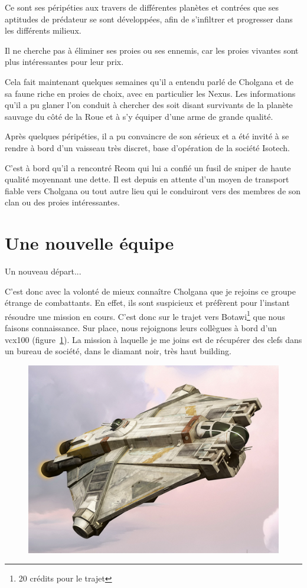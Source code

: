 \documentclass[a4paper,9pt,twoside,twocolumn,openany]{book}
\begin{document}
Ce sont ses péripéties aux travers de différentes planètes et contrées que ses aptitudes de prédateur se sont développées, afin de s'infiltrer et progresser dans les différents milieux.

Il ne cherche pas à éliminer ses proies ou ses ennemis, car les proies vivantes sont plus intéressantes pour leur prix.

Cela fait maintenant quelques semaines qu'il a entendu parlé de Cholgana et de sa faune riche en proies de choix, avec en particulier les Nexus. Les informations qu’il a pu glaner l’on conduit à chercher des soit disant survivants de la planète sauvage du côté de la Roue et à s’y équiper d’une arme de grande qualité.

Après quelques péripéties, il a pu convaincre de son sérieux et a été invité à se rendre à bord d’un vaisseau très discret, base d’opération de la société Isotech.

C’est à bord qu'il a rencontré Reom qui lui a confié un fusil de sniper de haute qualité moyennant une dette. Il est depuis en attente d’un moyen de transport fiable vers Cholgana ou tout autre lieu qui le conduiront vers des membres de son clan ou des proies intéressantes.

\section{Une nouvelle équipe}
\subtitle{8 décembre 2019}

Un nouveau départ...

C'est donc avec la volonté de mieux connaître Cholgana que je rejoins ce groupe étrange de combattants. En effet, ils sont suspicieux et préfèrent pour l'instant résoudre une mission en cours. C'est donc sur le trajet vers Botawi\footnote{20 crédits pour le trajet} que nous faisons connaissance. Sur place, nous rejoignons leurs collègues à bord d'un vcx100 (figure~\ref{vcx100}). La mission à laquelle je me joins est de récupérer des clefs dans un bureau de société, dans le diamant noir, très haut building.

\begin{figure}
    \includegraphics[width=0.6\columnwidth]{img/vcx100.png}
    
    \caption{\MakeUppercase{}}\label{vcx100}
\end{figure}
\end{document}

